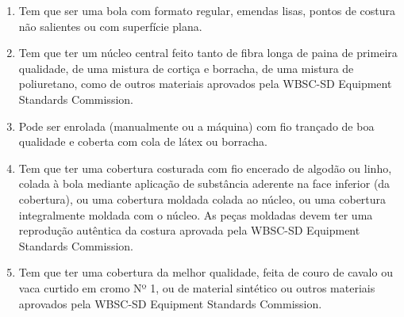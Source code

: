 \begin{multicols}{2} 
	\begin{enumerate}[label= \arabic*)]
		\item  Tem que ser uma bola com formato regular, emendas lisas, pontos de costura não 
		salientes ou com superfície plana. 
		\item Tem que ter um núcleo central feito tanto de fibra longa de paina de primeira 
		qualidade, de uma mistura de cortiça e borracha, de uma mistura de poliuretano, 
		como de outros materiais aprovados pela WBSC-SD Equipment Standards Commission. 
		\item  Pode ser enrolada (manualmente ou a máquina) com fio trançado de boa qualidade 
		e coberta com cola de látex ou borracha. 
		\item Tem que ter uma cobertura costurada com fio encerado de algodão ou linho, colada 
		à bola mediante aplicação de substância aderente na face inferior (da cobertura), ou 
		uma cobertura moldada colada ao núcleo, ou uma cobertura integralmente moldada 
		com o núcleo. As peças moldadas devem ter uma reprodução autêntica da costura 
		aprovada pela WBSC-SD Equipment Standards Commission. 
		\item  Tem que ter uma cobertura da melhor qualidade, feita de couro de cavalo ou vaca 
		curtido em cromo Nº 1, ou de material sintético ou outros materiais aprovados pela 
		WBSC-SD Equipment Standards Commission. 
	\end{enumerate}
\end{multicols}

